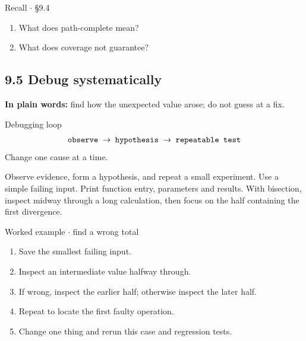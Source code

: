 \documentclass[11pt]{article}
\begin{document}
\begin{keepsection}
\begin{recallbox}{Recall \ensuremath{\cdot} §9.4}
\begin{enumerate}
\item What does path-complete mean?
\item What does coverage not guarantee?
\end{enumerate}

\end{recallbox}
\end{keepsection}

\begin{keepsection}
\section{9.5 Debug systematically}

\begin{plainbox}\textbf{In plain words:} find how the unexpected value arose; do not guess at a fix.\end{plainbox}

\begin{equationcard}{Debugging loop}
\[ \begin{gathered} \texttt{observe \ensuremath{\to} hypothesis \ensuremath{\to} repeatable test} \end{gathered} \]
{\small Change one cause at a time.}
\end{equationcard}

Observe evidence, form a hypothesis, and repeat a small experiment. Use a simple failing input. Print function entry, parameters and results. With bisection, inspect midway through a long calculation, then focus on the half containing the first divergence.

\begin{workedbox}{Worked example \ensuremath{\cdot} find a wrong total}
\begin{enumerate}
\item Save the smallest failing input.
\item Inspect an intermediate value halfway through.
\item If wrong, inspect the earlier half; otherwise inspect the later half.
\item Repeat to locate the first faulty operation.
\item Change one thing and rerun this case and regression tests.
\end{enumerate}
\end{workedbox}


\end{keepsection}
\end{document}
